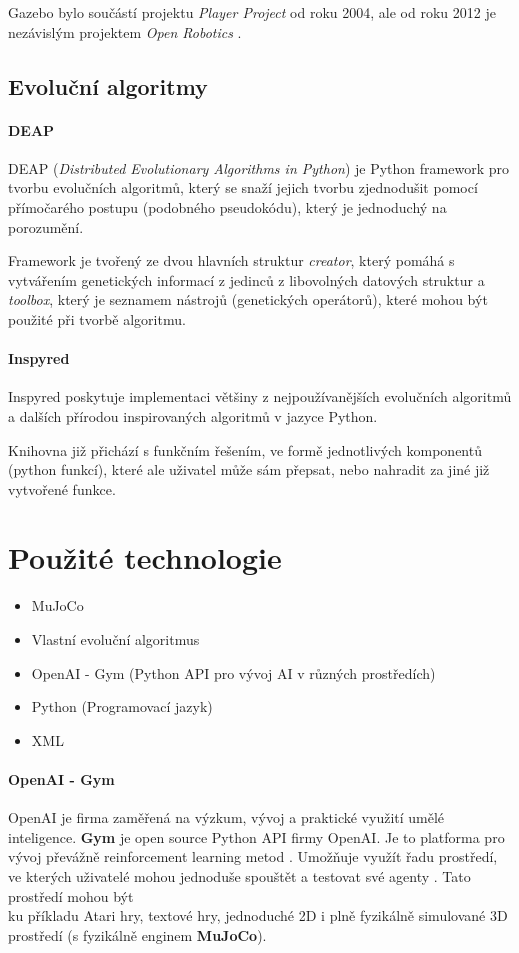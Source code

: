 \documentclass[a4paper, 12pt]{article}
\begin{document}
Gazebo bylo součástí projektu \emph{Player Project} od roku 2004, ale od roku 2012
je nezávislým projektem \emph{Open Robotics} \cite{gazebo}
\cite{playerproject}.

\subsection{Evoluční algoritmy}
\paragraph{DEAP}
DEAP (\emph{Distributed Evolutionary Algorithms in Python}) je Python framework
pro tvorbu evolučních algoritmů, který se snaží jejich tvorbu zjednodušit pomocí
přímočarého postupu (podobného pseudokódu), který je jednoduchý na porozumění.
\cite{fortin2012deap}

Framework je tvořený ze dvou hlavních struktur \emph{creator}, který pomáhá s
vytvářením genetických informací z jedinců z libovolných datových struktur a
\emph{toolbox}, který je seznamem nástrojů (genetických operátorů), které mohou
být použité při tvorbě algoritmu. 

\paragraph{Inspyred}
Inspyred poskytuje implementaci většiny z nejpoužívanějších evolučních
algoritmů a dalších přírodou inspirovaných algoritmů v jazyce Python. \cite{tonda2020inspyred}

Knihovna již přichází s funkčním řešením, ve formě jednotlivých komponentů
(python funkcí), které ale uživatel může sám přepsat, nebo nahradit za jiné již
vytvořené funkce.

\newpage

\section{Použité technologie}
\begin{itemize}
    \item MuJoCo 
    \item Vlastní evoluční algoritmus
    \item OpenAI - Gym (Python API pro vývoj AI v různých prostředích)
    \item Python (Programovací jazyk)
    \item XML
\end{itemize}


\paragraph{OpenAI - Gym} OpenAI je firma zaměřená na výzkum, vývoj a praktické využití umělé inteligence.
\textbf{Gym} je open source Python API firmy OpenAI. Je to platforma pro vývoj převážně
reinforcement learning metod \cite{brockman2016openai}. Umožňuje využít řadu prostředí, 
ve kterých uživatelé mohou jednoduše spouštět a testovat své agenty \cite{brockman2016openai}.
Tato prostředí mohou být \\ku příkladu Atari hry, textové hry, jednoduché 2D i plně fyzikálně simulované 3D
prostředí (s fyzikálně enginem \textbf {MuJoCo}).
\end{document}
